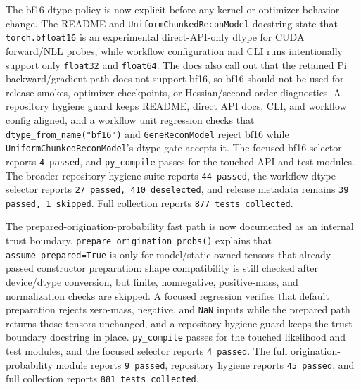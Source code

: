 \documentclass[11pt]{article}
\begin{document}
The bf16 dtype policy is now explicit before any kernel or optimizer behavior
change.  The README and \texttt{UniformChunkedReconModel} docstring state that
\texttt{torch.bfloat16} is an experimental direct-API-only dtype for CUDA
forward/NLL probes, while workflow configuration and CLI runs intentionally
support only \texttt{float32} and \texttt{float64}.  The docs also call out that
the retained Pi backward/gradient path does not support bf16, so bf16 should
not be used for release smokes, optimizer checkpoints, or Hessian/second-order
diagnostics.  A repository hygiene guard keeps README, direct API docs, CLI,
and workflow config aligned, and a workflow unit regression checks that
\texttt{dtype\_from\_name("bf16")} and \texttt{GeneReconModel} reject bf16
while \texttt{UniformChunkedReconModel}'s dtype gate accepts it.  The focused
bf16 selector reports \texttt{4 passed}, and \texttt{py\_compile} passes for
the touched API and test modules.  The broader repository hygiene suite reports
\texttt{44 passed}, the workflow dtype selector reports
\texttt{27 passed, 410 deselected}, and release metadata remains
\texttt{39 passed, 1 skipped}.  Full collection reports
\texttt{877 tests collected}.

The prepared-origination-probability fast path is now documented as an internal
trust boundary.  \texttt{prepare\_origination\_probs()} explains that
\texttt{assume\_prepared=True} is only for model/static-owned tensors that
already passed constructor preparation: shape compatibility is still checked
after device/dtype conversion, but finite, nonnegative, positive-mass, and
normalization checks are skipped.  A focused regression verifies that default
preparation rejects zero-mass, negative, and \texttt{NaN} inputs while the
prepared path returns those tensors unchanged, and a repository hygiene guard
keeps the trust-boundary docstring in place.  \texttt{py\_compile} passes for
the touched likelihood and test modules, and the focused selector reports
\texttt{4 passed}.  The full origination-probability module reports
\texttt{9 passed}, repository hygiene reports \texttt{45 passed}, and full
collection reports \texttt{881 tests collected}.
\end{document}
